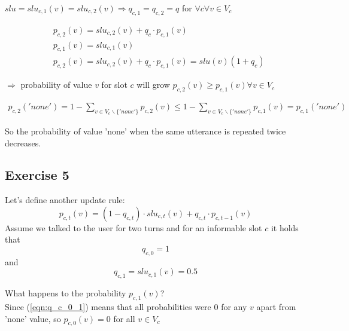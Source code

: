 \documentclass[12pt,titlepage,a4paper]{article}
\begin{document}
$slu = slu_{c, 1}(v) = slu_{c,2}(v) \Rightarrow q_{c,1} = q_{c, 2} = q$ for $\forall c \forall v \in V_c $

\begin{equation}
    \begin{aligned}
        &p_{c,2}(v) = slu_{c,2}(v) + q_c \cdot p_{c, 1}(v) 
        \\
        &p_{c,1}(v) = slu_{c,1}(v)
        \\
        &p_{c, 2}(v) = slu_{c,2}(v) + q_c \cdot p_{c, 1}(v) = slu(v)(1 + q_c)
    \end{aligned}
\end{equation}

$\Rightarrow$ probability of value $v$  for slot $c$ will grow $p_{c,2}(v) \geq p_{c,1}(v) \forall v \in V_c $

\begin{equation}
    \begin{aligned}
        p_{c,2}('none') = 1 - \sum_{v \in V_{c} \backslash \{'none'\}} p_{c,2}(v) \leq 1 - \sum_{v \in V_{c} \backslash \{'none'\}} p_{c,1}(v)  = p_{c,1}('none')
    \end{aligned}
\end{equation}

So the probability of value 'none' when the same utterance is repeated twice decreases.

\subsection{Exercise 5}
Let's define another update rule:
\begin{equation}
    p_{c,t}(v) = (1-q_{c,t})\cdot slu_{c,t}(v) + q_{c,t} \cdot p_{c,t-1}(v)
\end{equation}
Assume we talked to the user for two turns and for an informable slot $c$ it holds that 
\begin{equation}
    \label{eqn:q_c_0_1}
    q_{c, 0} = 1
\end{equation}
and 
\begin{equation}
    \label{eqn:q_c_1}
    q_{c, 1} = slu_{c,1}(v) = 0.5
\end{equation}

\noindent What happens to the probability $p_{c,1}(v)$?\\

\noindent Since (\ref{eqn:q_c_0_1}) means that all probabilities were 0 for any $v$ apart from 'none' value, so $p_{c,0}(v) = 0$ for all $v \in V_c$ \\
\end{document}
